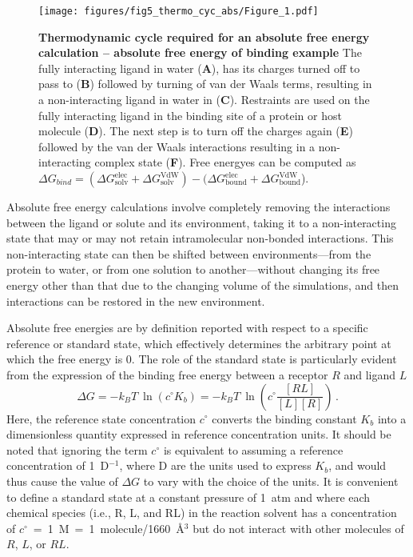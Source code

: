 \documentclass[9pt,bestpractices,pubversion]{livecoms}
\begin{document}
\begin{figure}
    \texttt{[image: figures/fig5\_thermo\_cyc\_abs/Figure\_1.pdf]}
    \caption{\textbf{Thermodynamic cycle required for an absolute free energy calculation -- absolute free energy of binding example} The fully interacting ligand in water (\textbf{A}), has its charges turned off to pass to (\textbf{B}) followed by turning of van der Waals terms, resulting in a non-interacting ligand in water in (\textbf{C}). Restraints are used on the fully interacting ligand in the binding site of a protein or host molecule (\textbf{D}). The next step is to turn off the charges again (\textbf{E}) followed by the van der Waals interactions resulting in a non-interacting complex state (\textbf{F}). Free energyes can be computed as $\Delta G_{bind} = (\Delta G^{\mathrm{elec}}_{\mathrm{solv}}+ \Delta G^{\mathrm{VdW}}_{\mathrm{solv}})-(\Delta G^{\mathrm{elec}}_{\mathrm{bound}}+ \Delta G^{\mathrm{VdW}}_{\mathrm{bound}}$).
    }
    \label{fig:fig_absolute_thermodynamic_cycle}
\end{figure}

Absolute free energy calculations involve completely removing the interactions between the ligand or solute and its environment, taking it to a non-interacting state that may or may not retain intramolecular non-bonded interactions.
This non-interacting state can then be shifted between environments---from the protein to water, or from one solution to another---without changing its free energy other than that due to the changing volume of the simulations, and then interactions can be restored in the new environment.

Absolute free energies are by definition reported with respect to a specific reference or standard state, which effectively determines the arbitrary point at which the free energy is 0.
The role of the standard state is particularly evident from the expression of the binding free energy between a receptor $R$ and ligand $L$
\begin{equation} \label{eq:DGfromKAB}
    \Delta G = -k_BT ~ \ln \left( c^{\circ} K_b \right)  = -k_BT ~ \ln\left( c^{\circ} \frac{[RL]}{[L][R]} \right) \, .
\end{equation}
Here, the reference state concentration $c^{\circ}$ converts the binding constant $K_b$ into a dimensionless quantity expressed in reference concentration units.
It should be noted that ignoring the term $c^{\circ}$ is equivalent to assuming a reference concentration of 1~D$^{-1}$, where D are the units used to express $K_b$, and would thus cause the value of $\Delta G$ to vary with the choice of the units.
It is convenient to define a standard state at a constant pressure of 1~atm and where each chemical species (i.e., R, L, and RL) in the reaction solvent has a concentration of $c^{\circ}$~=~1~M~=~1~molecule/1660~\r{A}$^3$ but do not interact with other molecules of $R$, $L$, or $RL$.
\end{document}
